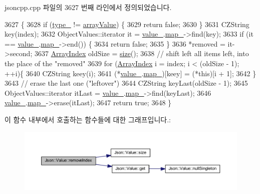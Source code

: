 jsoncpp.\+cpp 파일의 3627 번째 라인에서 정의되었습니다.


\begin{DoxyCode}
3627                                                         \{
3628   \textcolor{keywordflow}{if} (\hyperlink{class_json_1_1_value_abd222c2536dc88bf330dedcd076d2356}{type\_} != \hyperlink{namespace_json_a7d654b75c16a57007925868e38212b4eadc8f264f36b55b063c78126b335415f4}{arrayValue}) \{
3629     \textcolor{keywordflow}{return} \textcolor{keyword}{false};
3630   \}
3631   CZString key(index);
3632   ObjectValues::iterator it = \hyperlink{class_json_1_1_value_aef578244546212705b9f81eb84d7e151}{value\_}.\hyperlink{union_json_1_1_value_1_1_value_holder_a1e7a5b86d4f52234f55c847ad1ce389a}{map\_}->find(key);
3633   \textcolor{keywordflow}{if} (it == \hyperlink{class_json_1_1_value_aef578244546212705b9f81eb84d7e151}{value\_}.\hyperlink{union_json_1_1_value_1_1_value_holder_a1e7a5b86d4f52234f55c847ad1ce389a}{map\_}->end()) \{
3634     \textcolor{keywordflow}{return} \textcolor{keyword}{false};
3635   \}
3636   *removed = it->second;
3637   \hyperlink{namespace_json_a8048e741f2177c3b5d9ede4a5b8c53c2}{ArrayIndex} oldSize = \hyperlink{class_json_1_1_value_a0ec2808e1d7efa4e9fad938d6667be44}{size}();
3638   \textcolor{comment}{// shift left all items left, into the place of the "removed"}
3639   \textcolor{keywordflow}{for} (\hyperlink{namespace_json_a8048e741f2177c3b5d9ede4a5b8c53c2}{ArrayIndex} i = index; i < (oldSize - 1); ++i)\{
3640     CZString keey(i);
3641     (*\hyperlink{class_json_1_1_value_aef578244546212705b9f81eb84d7e151}{value\_}.\hyperlink{union_json_1_1_value_1_1_value_holder_a1e7a5b86d4f52234f55c847ad1ce389a}{map\_})[keey] = (*\textcolor{keyword}{this})[i + 1];
3642   \}
3643   \textcolor{comment}{// erase the last one ("leftover")}
3644   CZString keyLast(oldSize - 1);
3645   ObjectValues::iterator itLast = \hyperlink{class_json_1_1_value_aef578244546212705b9f81eb84d7e151}{value\_}.\hyperlink{union_json_1_1_value_1_1_value_holder_a1e7a5b86d4f52234f55c847ad1ce389a}{map\_}->find(keyLast);
3646   \hyperlink{class_json_1_1_value_aef578244546212705b9f81eb84d7e151}{value\_}.\hyperlink{union_json_1_1_value_1_1_value_holder_a1e7a5b86d4f52234f55c847ad1ce389a}{map\_}->erase(itLast);
3647   \textcolor{keywordflow}{return} \textcolor{keyword}{true};
3648 \}
\end{DoxyCode}
이 함수 내부에서 호출하는 함수들에 대한 그래프입니다.\+:
\nopagebreak
\begin{figure}[H]
\begin{center}
\leavevmode
\includegraphics[width=350pt]{class_json_1_1_value_ae9e67e08a85a2f3be3396ec0f4c47f65_cgraph}
\end{center}
\end{figure}
